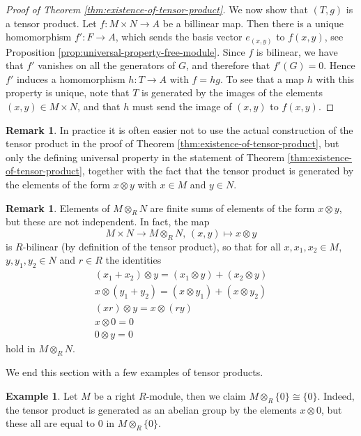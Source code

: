 \documentclass[11pt]{amsbook}
\theoremstyle{plain}
\theoremstyle{definition}
\newtheorem{example}[theorem]{Example}
\newtheorem{remark}[theorem]{Remark}
\begin{document}
\begin{proof}[Proof of Theorem \ref{thm:existence-of-tensor-product}]
We now show that $(T,g)$ is a tensor product. Let $f\colon M\times N \to A$ be a billinear map. Then there is a unique homomorphism
$f' \colon F \to A$, which sends the basis vector $e_{(x,y)}$ to $f(x,y)$, see Proposition \ref{prop:universal-property-free-module}.
Since $f$ is bilinear, we have that $f'$ vanishes on all the generators of $G$, and therefore that $f'(G)=0$. Hence $f'$ induces a homomorphism $h\colon T \to A$ with $f=hg$. To see that a map $h$ with this property is unique, note that $T$ is generated by the images of the elements $(x,y)\in M\times N$, and that $h$ must send the image of $(x,y)$ to $f(x,y)$.
\end{proof}


\begin{remark}
In practice it is often easier not to use the actual construction of the tensor product in the proof of Theorem \ref{thm:existence-of-tensor-product}, but only the defining universal property in the statement of Theorem  \ref{thm:existence-of-tensor-product}, together with the fact that the tensor product is generated by the elements of the form $x\otimes y$ with $x\in M$ and $y\in N$.
\end{remark}

\begin{remark}
Elements of $M\otimes_R N$ are finite sums of elements of the form $x\otimes y$, but these are not independent. In fact, 
the map
\[
	M\times N \to M\otimes_R N,\, (x,y) \mapsto x\otimes y
\]
is $R$-bilinear (by definition of the tensor product), so that for all  $x, x_1,x_2\in M$, $y,y_1,y_2\in N$ and $r\in R$  the identities
\begin{gather*}
	(x_1+x_2) \otimes y = (x_1 \otimes y) + (x_2 \otimes y) \\
	x\otimes (y_1+y_2) = (x \otimes y_1) + (x \otimes y_2) \\
	(xr) \otimes y = x \otimes (ry) \\
	x \otimes 0 = 0 \\
	0 \otimes y = 0 
\end{gather*}
hold in $M\otimes_R N$. 
\end{remark}


We end this section with a few examples of tensor products.

\begin{example}
Let $M$ be a right $R$-module, then we claim $M \otimes_R \{0\} \cong \{0\}$. Indeed, the tensor product is generated as an abelian group by the elements $x\otimes 0$, but these all are equal to $0$ in $M\otimes_R \{0\}$. 
\end{example}
\end{document}
